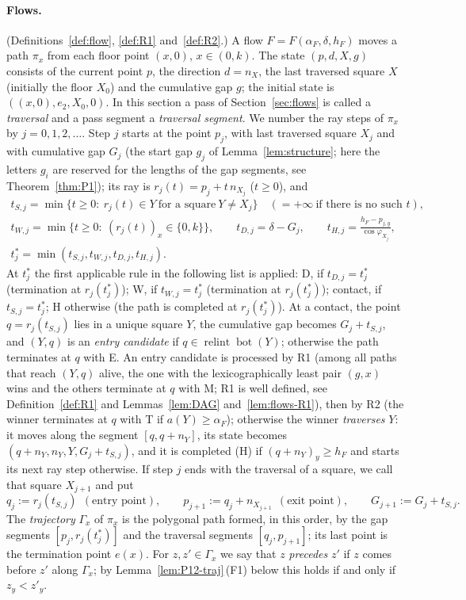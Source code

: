 \documentclass[11pt]{amsart}
\newcommand{\relint}{\operatorname{relint}}
\newcommand{\Bot}{\operatorname{bot}}
\theoremstyle{definition}
\theoremstyle{remark}
\numberwithin{equation}{section}
\begin{document}
\paragraph{Flows.}
(Definitions~\ref{def:flow}, \ref{def:R1} and~\ref{def:R2}.) A flow $F=F(\alpha_F,\delta,h_F)$ moves a path $\pi_x$ from each floor point $(x,0)$, $x\in(0,k)$. The state $(p,d,X,g)$ consists of the current point $p$, the direction $d=n_X$, the last traversed square $X$ (initially the floor $X_0$) and the cumulative gap $g$; the initial state is $((x,0),e_2,X_0,0)$. In this section a pass of Section~\ref{sec:flows} is called a \emph{traversal} and a pass segment a \emph{traversal segment}. We number the ray steps of $\pi_x$ by $j=0,1,2,\dots$. Step $j$ starts at the point $p_j$, with last traversed square $X_j$ and with cumulative gap $G_j$ (the start gap $g_j$ of Lemma~\ref{lem:structure}; here the letters $g_i$ are reserved for the lengths of the gap segments, see Theorem~\ref{thm:P1}); its ray is $r_j(t)=p_j+t\,n_{X_j}$ ($t\ge0$), and
\begin{gather*}
t_{S,j}=\min\{t\ge0:\ r_j(t)\in Y\ \text{for a square}\ Y\ne X_j\}\quad(=+\infty\ \text{if there is no such }t),\\
t_{W,j}=\min\{t\ge0:\ (r_j(t))_x\in\{0,k\}\},\qquad t_{D,j}=\delta-G_j,\qquad t_{H,j}=\frac{h_F-p_{j,y}}{\cos\varphi_{X_j}},\\
t^*_j=\min(t_{S,j},t_{W,j},t_{D,j},t_{H,j}).
\end{gather*}
At $t^*_j$ the first applicable rule in the following list is applied: D, if $t_{D,j}=t^*_j$ (termination at $r_j(t^*_j)$); W, if $t_{W,j}=t^*_j$ (termination at $r_j(t^*_j)$); contact, if $t_{S,j}=t^*_j$; H otherwise (the path is completed at $r_j(t^*_j)$). At a contact, the point $q=r_j(t_{S,j})$ lies in a unique square $Y$, the cumulative gap becomes $G_j+t_{S,j}$, and $(Y,q)$ is an \emph{entry candidate} if $q\in\relint\Bot(Y)$; otherwise the path terminates at $q$ with E. An entry candidate is processed by R1 (among all paths that reach $(Y,q)$ alive, the one with the lexicographically least pair $(g,x)$ wins and the others terminate at $q$ with M; R1 is well defined, see Definition~\ref{def:R1} and Lemmas~\ref{lem:DAG} and~\ref{lem:flows-R1}), then by R2 (the winner terminates at $q$ with T if $a(Y)\ge\alpha_F$); otherwise the winner \emph{traverses} $Y$: it moves along the segment $[q,q+n_Y]$, its state becomes $(q+n_Y,n_Y,Y,G_j+t_{S,j})$, and it is completed (H) if $(q+n_Y)_y\ge h_F$ and starts its next ray step otherwise. If step $j$ ends with the traversal of a square, we call that square $X_{j+1}$ and put
\[
q_j:=r_j(t_{S,j})\ \ (\text{entry point}),\qquad p_{j+1}:=q_j+n_{X_{j+1}}\ \ (\text{exit point}),\qquad G_{j+1}:=G_j+t_{S,j}.
\]
The \emph{trajectory} $\Gamma_x$ of $\pi_x$ is the polygonal path formed, in this order, by the gap segments $[p_j,r_j(t^*_j)]$ and the traversal segments $[q_j,p_{j+1}]$; its last point is the termination point $e(x)$. For $z,z'\in\Gamma_x$ we say that $z$ \emph{precedes} $z'$ if $z$ comes before $z'$ along $\Gamma_x$; by Lemma~\ref{lem:P12-traj}\,(F1) below this holds if and only if $z_y<z'_y$.
\end{document}
